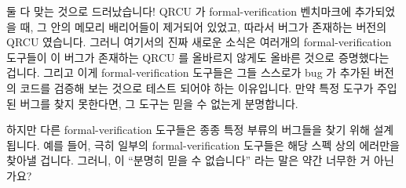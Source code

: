 둘 다 맞는 것으로 드러났습니다!
QRCU 가 formal-verification 벤치마크에 추가되었을 때, 그 안의 메모리 배리어들이
제거되어 있었고, 따라서 버그가 존재하는 버전의 QRCU 였습니다.
그러니 여기서의 진짜 새로운 소식은 여러개의 formal-verification 도구들이 이
버그가 존재하는 QRCU 를 올바르지 않게도 올바른 것으로 증명했다는 겁니다.
그리고 이게 formal-verification 도구들은 그들 스스로가 bug 가 추가된 버전의
코드를 검증해 보는 것으로 테스트 되어야 하는 이유입니다.
만약 특정 도구가 주입된 버그를 찾지 못한다면, 그 도구는 믿을 수 없는게
분명합니다.
\iffalse

Is QRCU really correct?
We have a Promela-based mechanical proof and a by-hand proof that both
say that it is.
However, a recent paper by Alglave et al.~\cite{JadeAlglave2013-cav}
says otherwise (see Section~5.1 of the paper at the bottom of page~12).
Which is it?

It turns out that both are correct!
When QRCU was added to a suite of formal-verification benchmarks,
its memory barriers were omitted, thus resulting in a buggy version
of QRCU.
So the real news here is that a number of formal-verification tools
incorrectly proved this buggy QRCU correct.
And this is why formal-verification tools themselves should be tested
using bug-injected versions of the code being verified.
If a given tool cannot find the injected bugs, then that tool is
clearly untrustworthy.
\fi

\QuickQuiz{}
	하지만 다른 formal-verification 도구들은 종종 특정 부류의 버그들을 찾기
	위해 설계됩니다.
	예를 들어, 극히 일부의 formal-verification 도구들은 해당 스펙 상의
	에러만을 찾아낼 겁니다.
	그러니, 이 ``분명히 믿을 수 없습니다'' 라는 말은 약간 너무한 거
	아닌가요?
	\iffalse


